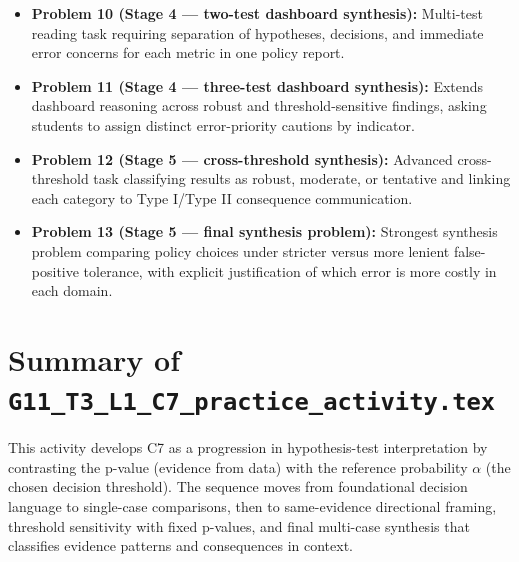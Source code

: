 \begin{itemize}
    \item \textbf{Problem 10 (Stage 4 --- two-test dashboard synthesis):} Multi-test reading task requiring separation of hypotheses, decisions, and immediate error concerns for each metric in one policy report.
    \item \textbf{Problem 11 (Stage 4 --- three-test dashboard synthesis):} Extends dashboard reasoning across robust and threshold-sensitive findings, asking students to assign distinct error-priority cautions by indicator.
    \item \textbf{Problem 12 (Stage 5 --- cross-threshold synthesis):} Advanced cross-threshold task classifying results as robust, moderate, or tentative and linking each category to Type I/Type II consequence communication.
    \item \textbf{Problem 13 (Stage 5 --- final synthesis problem):} Strongest synthesis problem comparing policy choices under stricter versus more lenient false-positive tolerance, with explicit justification of which error is more costly in each domain.
\end{itemize}

\section{Summary of \texttt{G11\_T3\_L1\_C7\_practice\_activity.tex}}
This activity develops C7 as a progression in hypothesis-test interpretation by contrasting the p-value (evidence from data) with the reference probability \(\alpha\) (the chosen decision threshold). The sequence moves from foundational decision language to single-case comparisons, then to same-evidence directional framing, threshold sensitivity with fixed p-values, and final multi-case synthesis that classifies evidence patterns and consequences in context.

